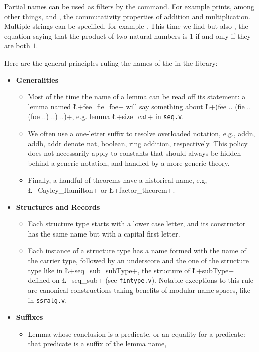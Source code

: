 Partial names can be used as filters by the  command. For example
 prints, among other things,  and ,
the commutativity properties of addition and multiplication.  Multiple
strings can be specified, for example .  This time
we find  but also , the equation saying that
the product of two natural numbers is $1$ if and only if they are both $1$.

Here are the general principles ruling the names of the in the \mcbMC{} library:
\begin{itemize}
\item{\bf Generalities}
  \begin{itemize}
  \item Most of the time the name of a lemma can be read off its
    statement: a lemma named \L+fee_fie_foe+ will say something about
    \L+(fee .. (fie ..(foe ..) ..) ..)+, e.g. lemma \L+size_cat+ in
    {\tt seq.v}.
  \item We often use a one-letter suffix to resolve overloaded
    notation, e.g., addn, addb, addr denote nat, boolean, ring
    addition, respectively. This policy does not necessarily apply to
    constants that should always be hidden behind a generic notation,
    and handled by a more generic theory.
  \item Finally, a handful of theorems have a historical name,
    e.g, \L+Cayley_Hamilton+ or \L+factor_theorem+.
  \end{itemize}
\item{\bf Structures and Records}
  \begin{itemize}
  \item Each structure type starts with a
    lower case letter, and its constructor has the same name but with a
    capital first letter.
  \item Each instance of a structure type has a name formed with the
    name of the carrier type, followed by an underscore and the one of
    the structure type like in \L+seq_sub_subType+, the structure of
    \L+subType+ defined on \L+seq_sub+ (see {\tt fintype.v}). Notable
    exceptions to this rule are canonical constructions taking
    benefits of modular name spaces, like in {\tt ssralg.v}.
  \end{itemize}
\item {\bf Suffixes}
  \begin{itemize}
  \item Lemma whose conclusion is a predicate, or an equality
    for a predicate: that predicate is a suffix of the lemma name,

\end{itemize}
\end{itemize}
